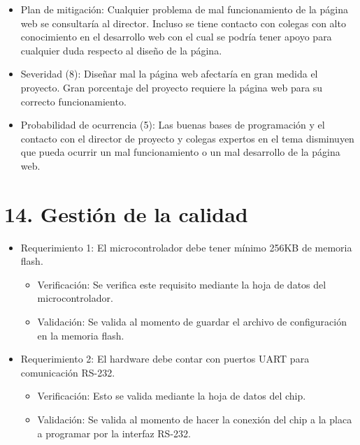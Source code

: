 \documentclass[
11pt, %
]{charter}
\begin{document}
\begin{itemize}

  \item Plan de mitigación: Cualquier problema de mal funcionamiento de la página web se consultaría al director. Incluso se tiene contacto con colegas con alto conocimiento en el desarrollo web con el cual se podría tener apoyo para cualquier duda respecto al diseño de la página.

  \item Severidad (8):
	Diseñar mal la página web afectaría en gran medida el proyecto. Gran porcentaje del proyecto requiere la página web para su correcto funcionamiento.
  
  \item Probabilidad de ocurrencia (5): 
  Las buenas bases de programación y el contacto con el director de proyecto y colegas expertos en el tema disminuyen que pueda ocurrir un mal funcionamiento o un mal desarrollo de la página web.
\end{itemize}


\section{14. Gestión de la calidad}
\label{sec:calidad}


\begin{itemize} 
\item Requerimiento 1: El microcontrolador debe tener mínimo 256KB de memoria flash.

\begin{itemize}
	\item Verificación: Se verifica este requisito mediante la hoja de datos del microcontrolador.
	
	\item Validación: Se valida al momento de guardar el archivo de configuración en la memoria flash.
\end{itemize}

\end{itemize}

\begin{itemize} 
\item Requerimiento 2: El hardware debe contar con puertos UART para comunicación RS-232.

\begin{itemize}
	\item Verificación: Esto se valida mediante la hoja de datos del chip.
	\item Validación: Se valida al momento de hacer la conexión del chip a la placa a programar por la interfaz RS-232.
\end{itemize}

\end{itemize}
\end{document}
